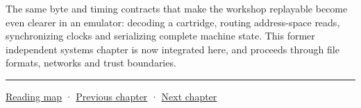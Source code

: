 The same byte and timing contracts that make the workshop replayable become even clearer in an emulator: decoding a cartridge, routing address-space reads, synchronizing clocks and serializing complete machine state. This former independent systems chapter is now integrated here, and proceeds through file formats, networks and trust boundaries.

\begin{center}\rule{0.5\linewidth}{0.5pt}\end{center}

\href{Chapter\%20Edition/03\%20-\%20Game\%20Engine/00\%20-\%20Reading\%20Map}{Reading map} · \hyperref[06-engine-ii-ch040]{Previous chapter} · \hyperref[06-engine-ii-ch042]{Next chapter}
